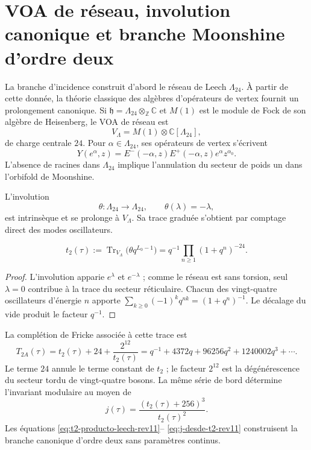 \section{VOA de réseau, involution canonique et branche Moonshine d'ordre deux}
\label{sec:voa-moonshine-orden-dos-rev11}

La branche d'incidence construit d'abord le réseau de Leech
\(\Lambda_{24}\). À partir de cette donnée, la théorie classique des algèbres
d'opérateurs de vertex fournit un prolongement canonique. Si
\(\mathfrak h=\Lambda_{24}\otimes_{\mathbb Z}\mathbb C\) et \(M(1)\) est
le module de Fock de son algèbre de Heisenberg, le VOA de réseau est
\begin{equation}
 V_{\Lambda}=M(1)\otimes\mathbb C[\Lambda_{24}],
 \label{eq:voa-reticular-leech-rev11}
\end{equation}
de charge centrale \(24\). Pour \(\alpha\in\Lambda_{24}\), ses opérateurs
de vertex s'écrivent
\[
 Y(e^\alpha,z)=E^-(-\alpha,z)E^+(-\alpha,z)e^\alpha z^{\alpha_0}.
\]
L'absence de racines dans \(\Lambda_{24}\) implique l'annulation du secteur
de poids un dans l'orbifold de Moonshine.

L'involution
\[
 \theta:\Lambda_{24}\longrightarrow\Lambda_{24},
 \qquad \theta(\lambda)=-\lambda,
\]
est intrinsèque et se prolonge à \(V_{\Lambda}\). Sa trace graduée s'obtient
par comptage direct des modes oscillateurs.

\begin{theorem}
\label{thm:traza-theta-leech-rev11}
\begin{equation}
 t_2(\tau)
 :=\operatorname{Tr}_{V_\Lambda}
 \bigl(\theta q^{L_0-1}\bigr)
 =q^{-1}\prod_{n\geq1}(1+q^n)^{-24}.
 \label{eq:t2-producto-leech-rev11}
\end{equation}
\end{theorem}
\begin{proof}
L'involution apparie \(e^\lambda\) et \(e^{-\lambda}\) ; comme le réseau
est sans torsion, seul \(\lambda=0\) contribue à la trace du secteur
réticulaire. Chacun des vingt-quatre oscillateurs d'énergie \(n\) apporte
\(\sum_{k\geq0}(-1)^kq^{nk}=(1+q^n)^{-1}\). Le décalage du vide
produit le facteur \(q^{-1}\).
\end{proof}

La complétion de Fricke associée à cette trace est
\begin{equation}
 T_{2A}(\tau)=t_2(\tau)+24+\frac{2^{12}}{t_2(\tau)}
 =q^{-1}+4372q+96256q^2+1240002q^3+\cdots.
 \label{eq:T2A-hmt-rev11}
\end{equation}
Le terme \(24\) annule le terme constant de \(t_2\) ; le facteur
\(2^{12}\) est la dégénérescence du secteur tordu de vingt-quatre bosons.
La même série de bord détermine l'invariant modulaire au moyen de
\begin{equation}
 \boxed{j(\tau)=\frac{(t_2(\tau)+256)^3}{t_2(\tau)^2}}.
 \label{eq:j-desde-t2-rev11}
\end{equation}
Les équations \eqref{eq:t2-producto-leech-rev11}--
\eqref{eq:j-desde-t2-rev11} construisent la branche canonique d'ordre deux sans
paramètres continus.

